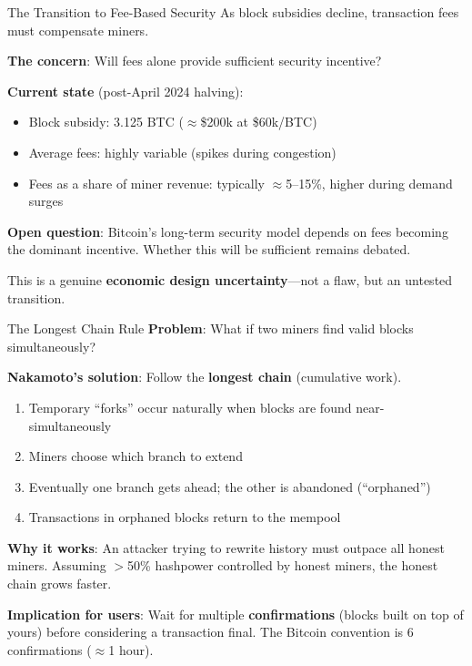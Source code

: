 \documentclass[10pt]{beamer}
\newcommand{\highlight}[1]{\textcolor{AccentOrange}{\textbf{#1}}}
\begin{document}
\begin{frame}{The Transition to Fee-Based Security}
  As block subsidies decline, transaction fees must compensate miners.
  
  \vspace{1em}
  \textbf{The concern}: Will fees alone provide sufficient security incentive?
  
  
  \vspace{1em}
  \textbf{Current state} (post-April 2024 halving):
  \begin{itemize}
    \item Block subsidy: 3.125 BTC ($\approx$\$200k at \$60k/BTC)
    \item Average fees: highly variable (spikes during congestion)
    \item Fees as a share of miner revenue: typically $\approx$5--15\%, higher during demand surges
  \end{itemize}
  
  \vspace{1em}
  \textbf{Open question}: Bitcoin's long-term security model depends on fees becoming the dominant incentive. Whether this will be sufficient remains debated.
  
  \vspace{0.5em}
  This is a genuine \highlight{economic design uncertainty}---not a flaw, but an untested transition.
\end{frame}

\begin{frame}{The Longest Chain Rule}
  \textbf{Problem}: What if two miners find valid blocks simultaneously?
  
  \vspace{1em}
  \textbf{Nakamoto's solution}: Follow the \highlight{longest chain} (cumulative work).
  
  \vspace{0.5em}
  \begin{enumerate}
    \item Temporary ``forks'' occur naturally when blocks are found near-simultaneously
    \item Miners choose which branch to extend
    \item Eventually one branch gets ahead; the other is abandoned (``orphaned'')
    \item Transactions in orphaned blocks return to the mempool
  \end{enumerate}
  
  \vspace{1em}
  \textbf{Why it works}: An attacker trying to rewrite history must outpace all honest miners. Assuming $>$50\% hashpower controlled by honest miners, the honest chain grows faster.
  
  \vspace{1em}
  \textbf{Implication for users}: Wait for multiple \highlight{confirmations} (blocks built on top of yours) before considering a transaction final. The Bitcoin convention is 6 confirmations ($\approx$1 hour).
\end{frame}
\end{document}
